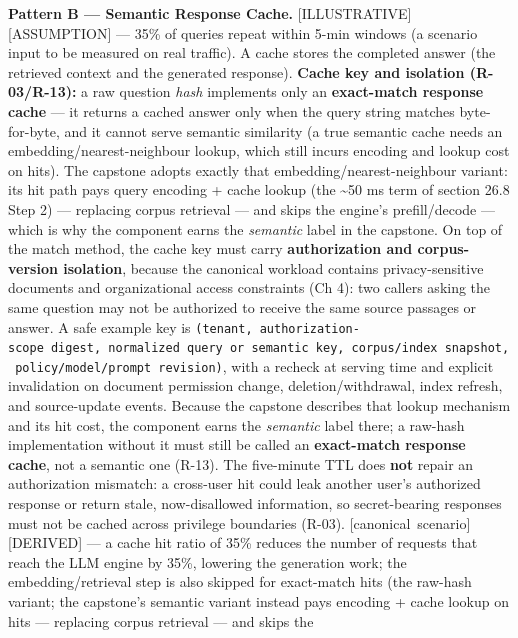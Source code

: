 \textbf{Pattern B --- Semantic Response Cache.}
\mbox{{[}ILLUSTRATIVE{]}}\hspace{0pt}\mbox{{[}ASSUMPTION{]}} --- 35\% of queries repeat within
5-min windows (a scenario input to be measured on real traffic). A cache
stores the completed answer (the retrieved context and the generated
response). \textbf{Cache key and isolation (R-03/R-13):} a raw question
\emph{hash} implements only an \textbf{exact-match response cache} ---
it returns a cached answer only when the query string matches
byte-for-byte, and it cannot serve semantic similarity (a true semantic
cache needs an embedding/nearest-neighbour lookup, which still incurs
encoding and lookup cost on hits). The capstone adopts exactly that
embedding/nearest-neighbour variant: its hit path pays query encoding +
cache lookup (the \textasciitilde50 ms term of section 26.8 Step 2) ---
replacing corpus retrieval --- and skips the engine's prefill/decode ---
which is why the component earns the \emph{semantic} label in the
capstone. On top of the match method, the cache key must carry
\textbf{authorization and corpus-version isolation}, because the
canonical workload contains privacy-sensitive documents and
organizational access constraints (Ch 4): two callers asking the same
question may not be authorized to receive the same source passages or
answer. A safe example key is
\texttt{(tenant,\ authorization-scope\ digest,\ normalized\ query\ or\ semantic\ key,\ corpus/index\ snapshot,\ policy/model/prompt\ revision)},
with a recheck at serving time and explicit invalidation on document
permission change, deletion/withdrawal, index refresh, and source-update
events. Because the capstone describes that lookup mechanism and its hit
cost, the component earns the \emph{semantic} label there; a raw-hash
implementation without it must still be called an \textbf{exact-match
response cache}, not a semantic one (R-13). The five-minute TTL does
\textbf{not} repair an authorization mismatch: a cross-user hit could
leak another user's authorized response or return stale, now-disallowed
information, so secret-bearing responses must not be cached across
privilege boundaries (R-03). \mbox{{[}canonical scenario{]}}\hspace{0pt}\mbox{{[}DERIVED{]}} --- a
cache hit ratio of 35\% reduces the number of requests that reach the
LLM engine by 35\%, lowering the generation work; the
embedding/retrieval step is also skipped for exact-match hits (the
raw-hash variant; the capstone's semantic variant instead pays encoding
+ cache lookup on hits --- replacing corpus retrieval --- and skips the
